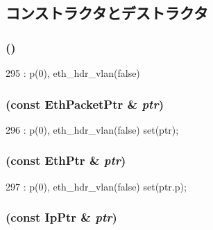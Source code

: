 \subsection{コンストラクタとデストラクタ}
\hypertarget{classNet_1_1IpPtr_a31b5c090bf379e291000879aa49a8af6}{
\subsubsection[{IpPtr}]{ ()}}
\label{classNet_1_1IpPtr_a31b5c090bf379e291000879aa49a8af6}



\begin{DoxyCode}
295 : p(0), eth_hdr_vlan(false) {}
\end{DoxyCode}
\hypertarget{classNet_1_1IpPtr_ae8184005d4874fca0a6abb2b940e9649}{
\subsubsection[{IpPtr}]{ (const {\bf EthPacketPtr} \& {\em ptr})}}
\label{classNet_1_1IpPtr_ae8184005d4874fca0a6abb2b940e9649}



\begin{DoxyCode}
296 : p(0), eth_hdr_vlan(false) { set(ptr); }
\end{DoxyCode}
\hypertarget{classNet_1_1IpPtr_adc162de1f572a7cadab4cc93b61cf2c4}{
\subsubsection[{IpPtr}]{ (const {\bf EthPtr} \& {\em ptr})}}
\label{classNet_1_1IpPtr_adc162de1f572a7cadab4cc93b61cf2c4}



\begin{DoxyCode}
297 : p(0), eth_hdr_vlan(false) { set(ptr.p); }
\end{DoxyCode}
\hypertarget{classNet_1_1IpPtr_a9eb7bc9c16efeb9f19f09a3e4ff89dcc}{
\subsubsection[{IpPtr}]{ (const {\bf IpPtr} \& {\em ptr})}}
\label{classNet_1_1IpPtr_a9eb7bc9c16efeb9f19f09a3e4ff89dcc}



